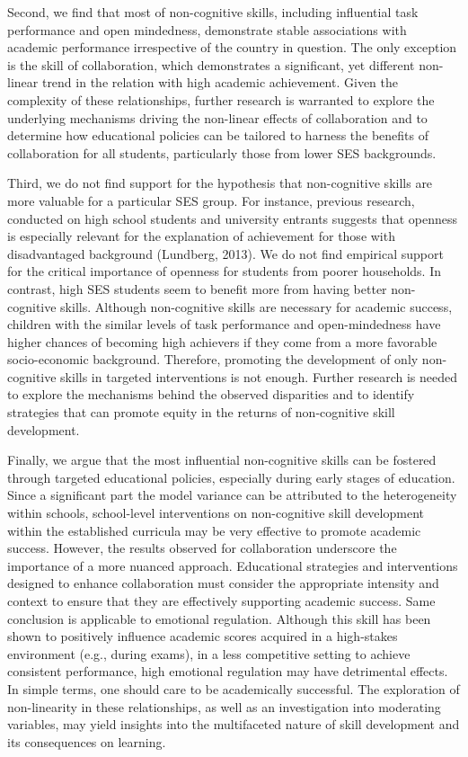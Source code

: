 \documentclass[
  12pt,
  a4paper,
]{article}
\begin{document}
Second, we find that most of non-cognitive skills, including influential
task performance and open mindedness, demonstrate stable associations
with academic performance irrespective of the country in question. The
only exception is the skill of collaboration, which demonstrates a
significant, yet different non-linear trend in the relation with high
academic achievement. Given the complexity of these relationships,
further research is warranted to explore the underlying mechanisms
driving the non-linear effects of collaboration and to determine how
educational policies can be tailored to harness the benefits of
collaboration for all students, particularly those from lower SES
backgrounds.

Third, we do not find support for the hypothesis that non-cognitive
skills are more valuable for a particular SES group. For instance,
previous research, conducted on high school students and university
entrants suggests that openness is especially relevant for the
explanation of achievement for those with disadvantaged background
(Lundberg, 2013). We do not find empirical support for the critical
importance of openness for students from poorer households. In contrast,
high SES students seem to benefit more from having better non-cognitive
skills. Although non-cognitive skills are necessary for academic
success, children with the similar levels of task performance and
open-mindedness have higher chances of becoming high achievers if they
come from a more favorable socio-economic background. Therefore,
promoting the development of only non-cognitive skills in targeted
interventions is not enough. Further research is needed to explore the
mechanisms behind the observed disparities and to identify strategies
that can promote equity in the returns of non-cognitive skill
development.

Finally, we argue that the most influential non-cognitive skills can be
fostered through targeted educational policies, especially during early
stages of education. Since a significant part the model variance can be
attributed to the heterogeneity within schools, school-level
interventions on non-cognitive skill development within the established
curricula may be very effective to promote academic success. However,
the results observed for collaboration underscore the importance of a
more nuanced approach. Educational strategies and interventions designed
to enhance collaboration must consider the appropriate intensity and
context to ensure that they are effectively supporting academic success.
Same conclusion is applicable to emotional regulation. Although this
skill has been shown to positively influence academic scores acquired in
a high-stakes environment (e.g., during exams), in a less competitive
setting to achieve consistent performance, high emotional regulation may
have detrimental effects. In simple terms, one should care to be
academically successful. The exploration of non-linearity in these
relationships, as well as an investigation into moderating variables,
may yield insights into the multifaceted nature of skill development and
its consequences on learning.
\end{document}
